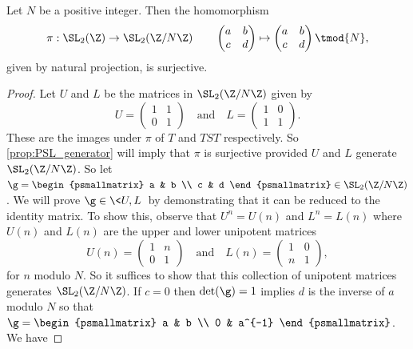 \documentclass[12pt]{article}
\begin{document}
      \begin{proposition}
        Let \(N\) be a positive integer. Then the homomorphism
        \[
          \pi:\SL_{2}(\Z) \to \SL_{2}(\Z/N\Z) \qquad \begin{pmatrix} a & b \\ c & d \end{pmatrix} \mapsto \begin{pmatrix} a & b \\ c & d \end{pmatrix} \tmod{N},
        \]
        given by natural projection, is surjective.
      \end{proposition}
      \begin{proof}
        Let \(U\) and \(L\) be the matrices in \(\SL_{2}(\Z/N\Z)\) given by
        \[
          U = \begin{pmatrix} 1 & 1 \\ 0 & 1 \end{pmatrix} \quad \text{and} \quad L = \begin{pmatrix} 1 & 0 \\ 1 & 1 \end{pmatrix}.
        \]
        These are the images under \(\pi\) of \(T\) and \(TST\) respectively. So \cref{prop:PSL_generator} will imply that \(\pi\) is surjective provided \(U\) and \(L\) generate \(\SL_{2}(\Z/N\Z)\). So let \(\g = \begin{psmallmatrix} a & b \\ c & d \end{psmallmatrix} \in \SL_{2}(\Z/N\Z)\). We will prove \(\g \in \<U,L\>\) by demonstrating that it can be reduced to the identity matrix. To show this, observe that \(U^{n} = U(n)\) and \(L^{n} = L(n)\) where \(U(n)\) and \(L(n)\) are the upper and lower unipotent matrices
        \[
          U(n) = \begin{pmatrix} 1 & n \\ 0 & 1 \end{pmatrix} \quad \text{and} \quad L(n) = \begin{pmatrix} 1 & 0 \\ n & 1 \end{pmatrix},
        \]
        for \(n\) modulo \(N\). So it suffices to show that this collection of unipotent matrices generates \(\SL_{2}(\Z/N\Z)\). If \(c = 0\) then \(\det(\g) = 1\) implies \(d\) is the inverse of \(a\) modulo \(N\) so that \(\g = \begin{psmallmatrix} a & b \\ 0 & a^{-1} \end{psmallmatrix}\). We have

\end{proof}
\end{document}

